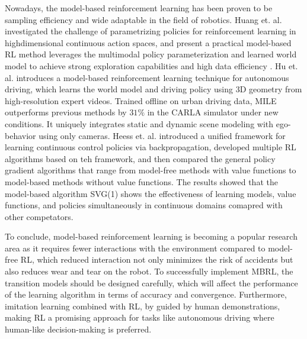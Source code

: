 Nowadays, the model-based reinforcement learning has been proven to be sampling efficiency and wide adaptable in the field of robotics. Huang et. al. investigated the challenge of parametrizing
policies for reinforcement learning in highdimensional continuous action spaces, and present a practical model-based RL method leverages the multimodal policy parameterization and learned world model to achieve strong exploration capabilities and high data efficiency \parencite{huang2023reparameterized}. Hu et. al. introduces a model-based reinforcement learning technique for autonomous driving, which learns the world model and driving policy using 3D geometry from high-resolution expert videos. Trained offline on urban driving data, MILE outperforms previous methods by $31\%$ in the CARLA simulator under new conditions. It uniquely integrates static and dynamic scene modeling with ego-behavior using only cameras\parencite{hu2022model}. Heess et. al. introduced a unified framework for learning continuous control policies via backpropagation, developed multiple RL algorithms based on teh framework, and then compared the general policy gradient algorithms that range from model-free methods with value functions to model-based methods without value functions. The results showed that the model-based algorithm SVG(1) shows the effectiveness of learning models, value functions, and policies simultaneously in continuous domains comapred with other competators. 

To conclude, model-based reinforcement learning is becoming a popular research area as it requires fewer interactions with the environment compared to model-free RL, which reduced interaction not only minimizes the risk of accidents but also reduces wear and tear on the robot. To successfully implement MBRL, the transition models should be designed carefully, which will affect the performance of the learning algorithm in terms of accuracy and convergence. Furthermore, imitation learning combined with RL, by guided by human demonstrations, making RL a promising approach for tasks like autonomous driving where human-like decision-making is preferred.